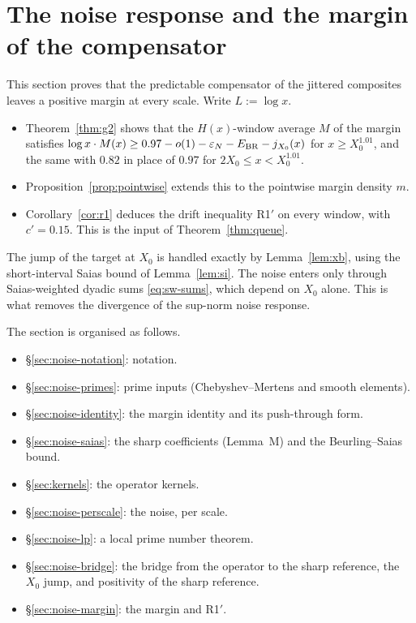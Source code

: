\section{The noise response and the margin of the compensator}\label{sec:noise}

This section proves that the predictable compensator of the jittered composites leaves a positive margin at every
scale. Write $L:=\log x$.
\begin{itemize}
\item Theorem~\ref{thm:g2} shows that the $H(x)$-window average $M$ of the margin satisfies
  $\log x\cdot M(x)\ge 0.97-o(1)-\varepsilon_N-E_{\mathrm{BR}}-j_{X_0}(x)$ for $x\ge X_0^{1.01}$, and the same with $0.82$ in place of $0.97$ for
  $2X_0\le x<X_0^{1.01}$.
\item Proposition~\ref{prop:pointwise} extends this to the pointwise margin density $m$.
\item Corollary~\ref{cor:r1} deduces the drift inequality R1$'$ on every window, with $c'=0.15$. This is the input of
  Theorem~\ref{thm:queue}.
\end{itemize}
The jump of the target at $X_0$ is handled exactly by Lemma~\ref{lem:xb}, using the short-interval Saias bound of
Lemma~\ref{lem:si}. The noise enters only through Saias-weighted dyadic sums \eqref{eq:sw-sums}, which depend on $X_0$
alone. This is what removes the divergence of the sup-norm noise response.

The section is organised as follows.
\begin{itemize}
\item \S\ref{sec:noise-notation}: notation.
\item \S\ref{sec:noise-primes}: prime inputs (Chebyshev--Mertens and smooth elements).
\item \S\ref{sec:noise-identity}: the margin identity and its push-through form.
\item \S\ref{sec:noise-saias}: the sharp coefficients (Lemma~M) and the Beurling--Saias bound.
\item \S\ref{sec:kernels}: the operator kernels.
\item \S\ref{sec:noise-perscale}: the noise, per scale.
\item \S\ref{sec:noise-lp}: a local prime number theorem.
\item \S\ref{sec:noise-bridge}: the bridge from the operator to the sharp reference, the $X_0$ jump, and positivity of
  the sharp reference.
\item \S\ref{sec:noise-margin}: the margin and R1$'$.
\end{itemize}









